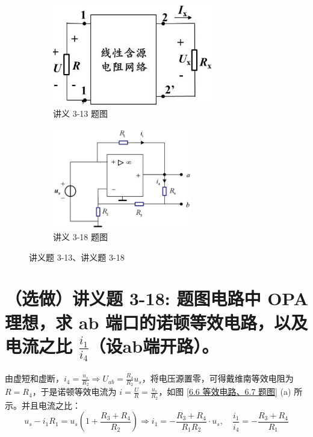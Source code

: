 \documentclass[UTF8]{report}
\theoremstyle{MyLineTheoremStyle} %
\theoremstyle{MyBlockTheoremStyle} %
\theoremstyle{MySubsubsectionStyle} %
\begin{document}
\begin{figure}[H]\centering
\begin{subfigure}[t]{0.45\columnwidth}\centering
    \includegraphics[height=125pt]{assets/6/image (9).jpg}
    \caption{ 讲义 3-13 题图 }
\end{subfigure}\hfill
\begin{subfigure}[t]{0.55\columnwidth}\centering
    \includegraphics[height=125pt]{assets/6/image (10).jpg}
    \caption{ 讲义 3-18 题图 }
\end{subfigure}
\caption{ 讲义题 3-13、讲义题 3-18 }
\end{figure}

\section{（选做）讲义题 3-18: 题图电路中 OPA 理想，求 ab 端口的诺顿等效电路，以及电流之比 $\frac{i_1}{i_4}$（设ab端开路）。}

由虚短和虚断，$i_4 = \frac{u_s}{R_2} \Longrightarrow U_{ab} = \frac{R_4}{R_2}u_s$，将电压源置零，可得戴维南等效电阻为 $R = R_4$，于是诺顿等效电流为 $i = \frac{U}{R} = \frac{u_s}{R_2}$，如图 \ref{6.6 等效电路、6.7 题图} (a) 所示。并且电流之比：
\begin{equation}
u_s - i_1R_1 = u_s\left(1 + \frac{R_3 + R_4}{R_2}\right) \Longrightarrow  i_1 = - \frac{R_3 + R_4}{R_1R_2}\cdot u_s,\quad 
\boxed{
    \frac{i_1}{i_4} = - \frac{R_3 + R_4}{R_1}
}
\end{equation}
\end{document}
